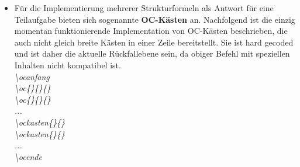 \documentclass[../main.tex]{subfiles}
\begin{document}
\begin{itemize}
    \item Für die Implementierung mehrerer Strukturformeln als Antwort für eine Teilaufgabe bieten sich sogenannte \textbf{OC-K\"asten} an. Nachfolgend ist die einzig momentan funktionierende Implementation von OC-K\"asten beschrieben, die auch nicht gleich breite K\"asten in einer Zeile bereitstellt. Sie ist hard gecoded und ist daher die aktuelle R\"uckfallebene sein, da obiger Befehl mit speziellen Inhalten nicht kompatibel ist. \hypertarget{oc}{} \hypertarget{ocanfang}{} \hypertarget{ocende}{} \hypertarget{ochilf}{} \hypertarget{ockasten}{}\\
    \textit{\textbackslash ocanfang \\\textbackslash oc\{\}\{\}\{\} \\\textbackslash oc\{\}\{\}\{\} \\...\\\textbackslash ockasten\{\}\{\}\\\textbackslash ockasten\{\}\{\}\\...\\\textbackslash ocende}\\

\end{itemize}
\end{document}

